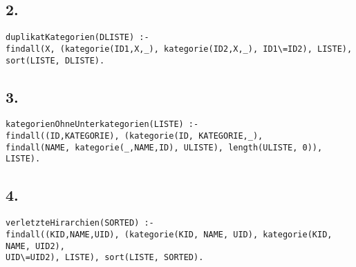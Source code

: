 \documentclass[a4paper, 11pt]{article}
\begin{document}
\subsection*{2.}
\begin{verbatim}
duplikatKategorien(DLISTE) :- 
findall(X, (kategorie(ID1,X,_), kategorie(ID2,X,_), ID1\=ID2), LISTE),
sort(LISTE, DLISTE).
\end{verbatim}
\subsection*{3.}
\begin{verbatim}
kategorienOhneUnterkategorien(LISTE) :-
findall((ID,KATEGORIE), (kategorie(ID, KATEGORIE,_),
findall(NAME, kategorie(_,NAME,ID), ULISTE), length(ULISTE, 0)), LISTE).
\end{verbatim}
\subsection*{4.}
\begin{verbatim}
verletzteHirarchien(SORTED) :-
findall((KID,NAME,UID), (kategorie(KID, NAME, UID), kategorie(KID, NAME, UID2),
UID\=UID2), LISTE), sort(LISTE, SORTED).
\end{verbatim}
\end{document}
